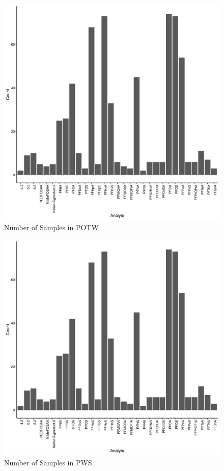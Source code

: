 \documentclass[
  12pt,
]{article}
\begin{document}
\begin{figure}

\includegraphics{PFAS_FinalProject_files/figure-latex/plotN-1} \hfill{}

\caption{Number of Samples in POTW}\label{fig:plotN}
\end{figure}
\begin{figure}

\includegraphics{PFAS_FinalProject_files/figure-latex/plotW-1} \hfill{}

\caption{Number of Samples in PWS}\label{fig:plotW}
\end{figure}
\end{document}
